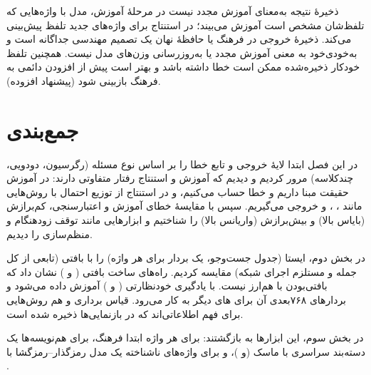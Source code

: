 \begin{correctionbox}{ذخیرهٔ نتیجه به‌معنای آموزش مجدد نیست}
در مرحلهٔ آموزش، مدل  با واژه‌هایی که تلفظ‌شان مشخص است آموزش می‌بیند؛ در استنتاج برای واژه‌های جدید تلفظ پیش‌بینی می‌کند. ذخیرهٔ خروجی در فرهنگ یا حافظهٔ نهان یک تصمیم مهندسی جداگانه است و به‌خودی‌خود به معنی آموزش مجدد یا به‌روزرسانی وزن‌های مدل نیست. همچنین تلفظ خودکار ذخیره‌شده ممکن است خطا داشته باشد و بهتر است پیش از افزودن دائمی به فرهنگ بازبینی شود (پیشنهاد افزوده).
\end{correctionbox}

\section{جمع‌بندی}

در این فصل ابتدا لایهٔ خروجی و تابع خطا را بر اساس نوع مسئله (رگرسیون، دودویی، چندکلاسه) مرور کردیم و دیدیم که آموزش و استنتاج رفتار متفاوتی دارند: در آموزش حقیقت مبنا داریم و خطا حساب می‌کنیم، و در استنتاج از توزیع احتمال با روش‌هایی مانند ، ،  و  خروجی می‌گیریم. سپس با مقایسهٔ خطای آموزش و اعتبارسنجی، کم‌برازش (بایاس بالا) و بیش‌برازش (واریانس بالا) را شناختیم و ابزارهایی مانند توقف زودهنگام و منظم‌سازی را دیدیم.

در بخش دوم،  ایستا (جدول جست‌وجو، یک بردار برای هر واژه) را با  بافتی (تابعی از کل جمله و مستلزم اجرای شبکه) مقایسه کردیم. راه‌های ساخت بافتی ( و ) نشان داد که بافتی‌بودن با  هم‌ارز نیست. با یادگیری خودنظارتی ( و )  آموزش داده می‌شود و بردارهای ۷۶۸‌بعدی آن برای های دیگر به کار می‌رود. قیاس برداری و  هم روش‌هایی برای فهم اطلاعاتی‌اند که در بازنمایی‌ها ذخیره شده است.

در بخش سوم، این ابزارها به  بازگشتند: برای هر واژه ابتدا فرهنگ، برای هم‌نویسه‌ها یک دسته‌بند سراسری با ماسک (و )، و برای واژه‌های ناشناخته یک مدل  رمزگذار–رمزگشا با .

